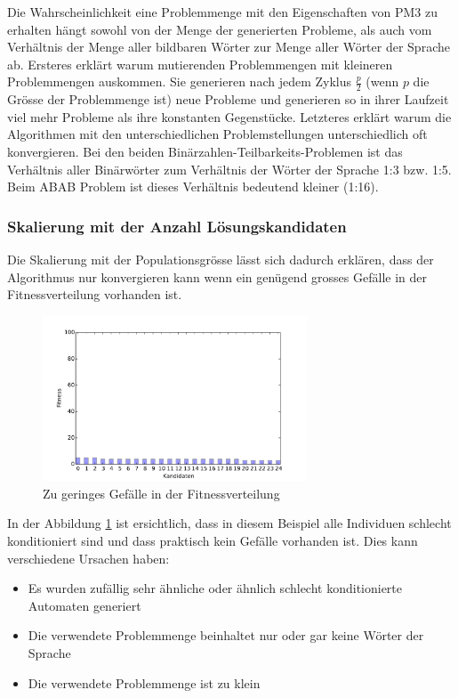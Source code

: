 Die Wahrscheinlichkeit eine Problemmenge mit den Eigenschaften von PM3 zu erhalten hängt sowohl von der Menge der generierten Probleme, als auch vom Verhältnis der Menge aller bildbaren Wörter zur Menge aller Wörter der Sprache ab. Ersteres erklärt warum mutierenden Problemmengen mit kleineren Problemmengen auskommen. Sie generieren nach jedem Zyklus $\frac{p}{2}$ (wenn $p$ die Grösse der Problemmenge ist) neue Probleme und generieren so in ihrer Laufzeit viel mehr Probleme als ihre konstanten Gegenstücke. Letzteres erklärt warum die Algorithmen mit den unterschiedlichen Problemstellungen unterschiedlich oft konvergieren. Bei den beiden Binärzahlen-Teilbarkeits-Problemen ist das Verhältnis aller Binärwörter zum Verhältnis der Wörter der Sprache 1:3 bzw. 1:5. Beim ABAB Problem ist dieses Verhältnis bedeutend kleiner (1:16).

\subsubsection{Skalierung mit der Anzahl Lösungskandidaten}
Die Skalierung mit der Populationsgrösse lässt sich dadurch erklären, dass der Algorithmus nur konvergieren kann wenn ein genügend grosses Gefälle in der Fitnessverteilung vorhanden ist.

\begin{figure}[ht]
  \centering
  \includegraphics[width=0.7\textwidth]{images/bars_fitness.pdf}
  \caption[Zu geringes Gefälle in der Fitnessverteilung]{Zu geringes Gefälle in der Fitnessverteilung}
  \label{fig:bars_fitness.pdf}
\end{figure}

In der Abbildung \ref{fig:bars_fitness.pdf} ist ersichtlich, dass in diesem Beispiel alle Individuen schlecht konditioniert sind und dass praktisch kein Gefälle vorhanden ist. Dies kann verschiedene Ursachen haben:

\begin{itemize}
	\item Es wurden zufällig sehr ähnliche oder ähnlich schlecht konditionierte Automaten generiert 
	\item Die verwendete Problemmenge beinhaltet nur oder gar keine Wörter der Sprache
	\item Die verwendete Problemmenge ist zu klein
\end{itemize}

